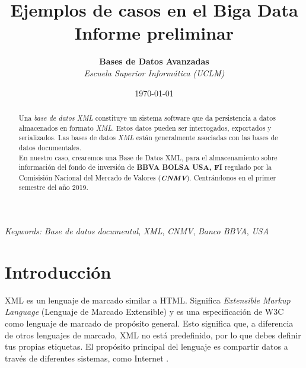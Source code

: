 \documentclass[11pt]{diazessay} %
\title{\textbf{Ejemplos de casos en el Biga Data \\ Informe preliminar}} %
\author{\textbf{Bases de Datos Avanzadas} \\ \textit{Escuela Superior Informática (UCLM)}} %
\date{\today} %
\begin{document}
\maketitle %




\begin{abstract}
	
	Una \textit{base de datos XML} constituye un sistema software que da persistencia a datos almacenados en formato \textit{XML}. Estos datos pueden ser interrogados, exportados y serializados. Las bases de datos \textit{XML} están generalmente asociadas con las bases de datos documentales.\\
	
	En nuestro caso, crearemos una Base de Datos XML, para el almacenamiento sobre información del fondo de inversión de \textbf{BBVA BOLSA USA, FI} regulado por la Comisisión Nacional del Mercado de Valores (\textbf{\textit{CNMV}}). Centrándonos en el primer semestre del año 2019.
\end{abstract}

\hspace*{3.6mm}\textit{Keywords:} \textit{Base de datos documental}, \textit{XML}, \textit{CNMV}, \textit{Banco BBVA}, \textit{USA}

\vspace{20pt} %

\newpage
\section*{Introducción}

XML \cite{xml} es un lenguaje de marcado similar a HTML. Significa \textit{Extensible Markup Language} (Lenguaje de Marcado Extensible) y es una especificación de W3C como lenguaje de marcado de propósito general. Esto significa que, a diferencia de otros lenguajes de marcado, XML no está predefinido, por lo que debes definir tus propias etiquetas. El propósito principal del lenguaje es compartir datos a través de diferentes sistemas, como Internet \cite{intro_xml}.\\
\end{document}
